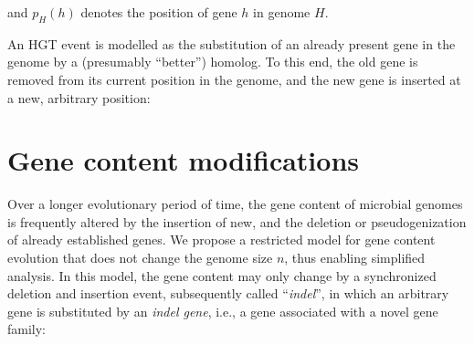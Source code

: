 \documentclass[9pt,english,utf8]{article}
\begin{document}
\noindent and $p_H(h)$ denotes the position of gene $h$ in genome $H$. 

\smallskip
An HGT event is modelled as the substitution of an already present gene in the
genome by a (presumably ``better'') homolog. To this end, the old gene is
removed from its current position in the genome, and the new gene is inserted at
a new, arbitrary position:

\begin{center}
\end{center}

\section{Gene content modifications}

%    

Over a longer evolutionary period of time, the gene content of microbial genomes
is frequently altered by the insertion of new, and the deletion or
pseudogenization of already established genes.  We propose a restricted model
for gene content evolution that does not change the genome size $n$, thus
enabling simplified analysis. In this model, the gene content may only change by
a synchronized deletion and insertion event, subsequently called
``\emph{indel}'', in which an arbitrary gene is substituted by an \emph{indel
gene}, i.e., a gene associated with a novel gene family:
\end{document}
